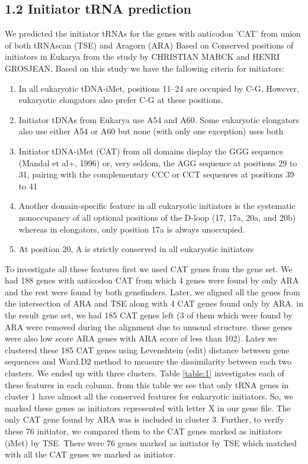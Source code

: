\documentclass[table,
12pt, %
a4paper, %
oneside, %
headinclude,footinclude, %
BCOR5mm, %
]{scrartcl}
\begin{document}
\subsection{\textbf{1.2 Initiator tRNA prediction}}
We predicted the initiator tRNAs for the genes with anticodon 'CAT' from union of both tRNAscan (TSE) and Aragorn (ARA) Based on Conserved positions of initiators in Eukarya from the study by CHRISTIAN MARCK and HENRI GROSJEAN. Based on this study we have the fallowing citeria for initiators:
\begin{enumerate}[noitemsep] %
  \item In all eukaryotic tDNA-iMet, positions 11–24 are occupied by C-G, However, eukaryotic elongators
        also prefer C-G at these positions.

  \item Initiator tDNAs from Eukarya use A54 and A60. Some eukaryotic elongators also use either A54 or
        A60 but none (with only one exception) uses both

  \item Initiator tDNA-iMet (CAT) from all domains display the GGG sequence (Mandal et al+, 1996) or,
        very seldom, the AGG sequence at positions 29 to 31, pairing with the complementary CCC or
        CCT sequences at positions 39 to 41

  \item Another domain-specific feature in all eukaryotic initiators is the systematic nonoccupancy of all
        optional positions of the D-loop (17, 17a, 20a, and 20b) whereas in elongators, only position 17a is always unoccupied.

  \item At position 20, A is strictly conserved in all eukaryotic initiators
\end{enumerate}
To investigate all these features first we used CAT genes from the gene set. We had 188 genes with anticodon CAT from which 4 genes were found by only ARA and the rest were found by both genefinders. Later, we aligned all the genes from the intersection of ARA and TSE along with 4 CAT genes found only by ARA. in the result gene set, we had 185 CAT genes left (3 of them which were found by ARA were removed during the alignment due to unusual structure. these genes were also low score ARA genes with ARA score of less than 102). Later we clustered these 185 CAT genes using Levenshtein (edit) distance between gene sequences and Ward.D2 method to measure the dissimilarity between each two clusters. We ended up with three clusters. Table \ref{table:1} investigates each of these features in each column. from this table we see that only tRNA genes in cluster 1 have almost all the conserved features for eukaryotic initiators. So, we marked these genes as initiators represented with letter X in our gene file. The only CAT gene found by ARA was is included in cluster 3. Further, to verify these 76 initiator, we compared them to the CAT genes marked as initiators (iMet) by TSE. There were 76 genes marked as initiator by TSE which matched with all the CAT genes we marked as initiator.
\end{document}

